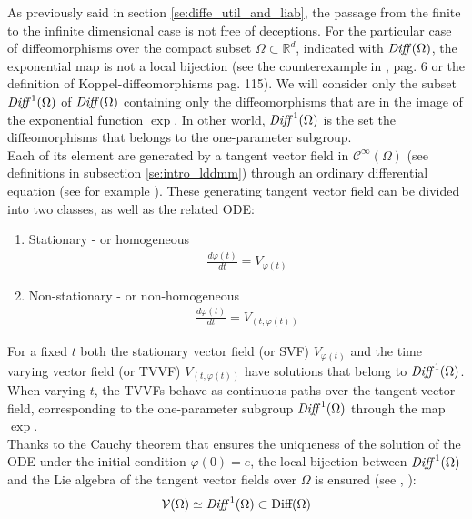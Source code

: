 As previously said in section \ref{se:diffe_util_and_liab}, the passage from the finite to the infinite dimensional case is not free of deceptions. For the particular case of diffeomorphisms over the compact subset $\Omega\subset\mathbb{R}^d$, indicated with $\text{\emph{Diff}}(\Omega)$, the exponential map is not a local bijection (see the counterexample in \cite{lorenzi2013geodesics}, pag. 6 or the definition of Koppel-diffeomorphisms \cite{grabowski1988free} pag. 115). 
We will consider only the subset $\text{\emph{Diff}}^{1}(\Omega)$ of $\text{\emph{Diff}}(\Omega)$ containing only the diffeomorphisms that are in the image of the exponential function $\exp$. In other world, $\text{\emph{Diff}}^{1}(\Omega)$ is the set the diffeomorphisms that belongs to the one-parameter subgroup.\\
Each of its element are generated by a tangent vector field in $\mathcal{C}^{\infty}(\Omega)$ (see definitions in subsection \ref{se:intro_lddmm}) through an ordinary differential equation (see for example \cite{arnold2006ordinary}). These generating tangent vector field can be divided into two classes, as well as the related ODE:
\begin{enumerate}
	\item Stationary  - or homogeneous
	\begin{align*}
	\frac{d\varphi(t)}{dt} = V_{\varphi(t)}
	\end{align*}
	\item Non-stationary - or non-homogeneous
	\begin{align*}
	\frac{d\varphi(t)}{dt} = V_{(t, \varphi(t))}
	\end{align*}
\end{enumerate}
For a fixed $t$ both the stationary vector field (or SVF) $V_{\varphi(t)}$ and the time varying vector field (or TVVF) $V_{(t, \varphi(t))}$ have solutions that belong to $\text{\emph{Diff}}^{1}(\Omega)$. When varying $t$, the TVVFs behave as continuous paths over the tangent vector field, corresponding to the one-parameter subgroup $\text{\emph{Diff}}^{1}(\Omega)$ through the map $\exp$.\\
Thanks to the Cauchy theorem that ensures the uniqueness of the solution of the ODE under the initial condition $\varphi(0) = e$, the local bijection between $\text{\emph{Diff}}^{1}(\Omega)$ and the Lie algebra of the tangent vector fields over $\Omega$ is ensured (see \cite{milnor1982infinite}, \cite{khesin2008geometry}):
\begin{align*}
\mathcal{V}(\Omega) \simeq  \text{\emph{Diff}}^{1}(\Omega) \subset \text{Diff}(\Omega)
\end{align*}

